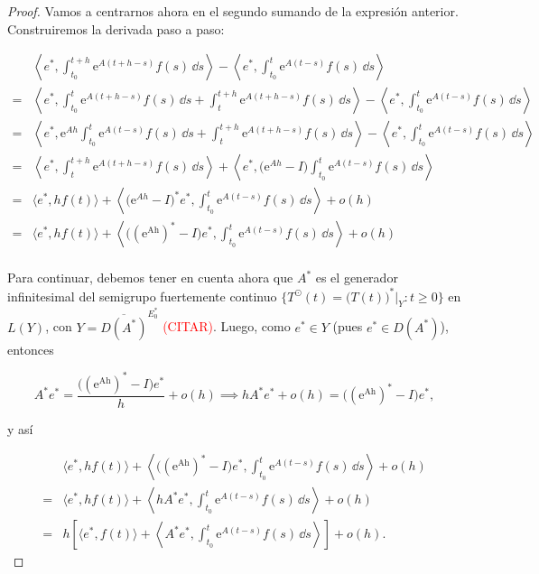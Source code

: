 \begin{proof}
    Vamos a centrarnos ahora en el segundo sumando de la expresión anterior. Construiremos la derivada paso a paso:

    \begin{align*}
        &\left \langle e^*, \int_{t_0}^{t + h}\mathrm{e}^{A(t + h - s)}f(s) \, \dd s \right \rangle - \left \langle e^*, \int_{t_0}^{t}\mathrm{e}^{A(t - s)}f(s) \, \dd s \right \rangle\\
        =& \left \langle e^*, \int_{t_0}^{t}\mathrm{e}^{A(t + h - s)}f(s) \, \dd s + \int_{t}^{t + h}\mathrm{e}^{A(t + h - s)}f(s) \, \dd s \right \rangle - \left \langle e^*, \int_{t_0}^{t}\mathrm{e}^{A(t - s)}f(s) \, \dd s \right \rangle\\
        =& \left \langle e^*, \mathrm{e}^{Ah}\int_{t_0}^{t}\mathrm{e}^{A(t - s)}f(s) \, \dd s + \int_{t}^{t + h}\mathrm{e}^{A(t + h - s)}f(s) \, \dd s \right \rangle - \left \langle e^*, \int_{t_0}^{t}\mathrm{e}^{A(t - s)}f(s) \, \dd s \right \rangle\\
        =& \left \langle e^*, \int_{t}^{t + h}\mathrm{e}^{A(t + h - s)}f(s) \, \dd s \right \rangle + \left \langle e^*, \big(\mathrm{e}^{Ah} - I \big)\int_{t_0}^{t}\mathrm{e}^{A(t - s)}f(s) \, \dd s \right \rangle\\
        =& \langle e^*, h f(t) \rangle + \left \langle \big(\mathrm{e}^{Ah} - I \big)^* e^*, \int_{t_0}^{t}\mathrm{e}^{A(t - s)}f(s) \, \dd s \right \rangle + o(h)\\
        =& \langle e^*, h f(t) \rangle + \left \langle \Big(\mathrm{(e^{Ah})^*} - I\Big) e^*, \int_{t_0}^{t}\mathrm{e}^{A(t - s)}f(s) \, \dd s \right \rangle + o(h)\\
    \end{align*}

    Para continuar, debemos tener en cuenta ahora que $A^*$ es el generador infinitesimal del semigrupo fuertemente continuo $\{T^\odot (t) = \big(T(t)\big)^* |_Y : t \geq 0 \}$ en $L(Y)$, con $Y = \overline{D(A^*)}^{E_0^*}$ \textcolor{red}{(CITAR)}. Luego, como $e^* \in Y$ (pues $e^* \in D(A^*)$), entonces

    \[A^* e^* = \frac{\Big(\mathrm{(e^{Ah})^*} - I\Big) e^*}{h} + o(h) \implies hA^*e^* + o(h) = \Big(\mathrm{(e^{Ah})^*} - I\Big) e^*,\]

    y así

    \begin{align*}
        &\langle e^*, h f(t) \rangle + \left \langle \Big(\mathrm{(e^{Ah})^*} - I\Big) e^*, \int_{t_0}^{t}\mathrm{e}^{A(t - s)}f(s) \, \dd s \right \rangle + o(h)\\
        =&\langle e^*, h f(t) \rangle + \left \langle hA^* e^*, \int_{t_0}^{t}\mathrm{e}^{A(t - s)}f(s) \, \dd s \right \rangle + o(h)\\
        =&h \left[ \langle e^*, f(t) \rangle + \left \langle A^* e^*, \int_{t_0}^{t}\mathrm{e}^{A(t - s)}f(s) \, \dd s \right \rangle \right] + o(h).
    \end{align*}


\end{proof}
